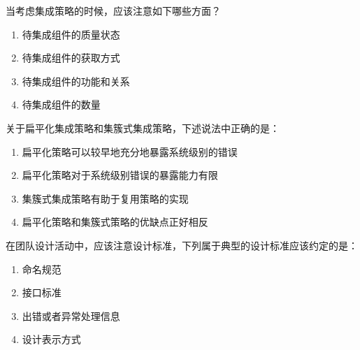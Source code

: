 \begin{problem}
	当考虑集成策略的时候，应该注意如下哪些方面？
    \vspace{-0.8em}
    \begin{multicols}{2}
        \begin{enumerate}[label=\Alph*.]
            \item 待集成组件的质量状态
            \item 待集成组件的获取方式
            \item 待集成组件的功能和关系
            \item 待集成组件的数量
        \end{enumerate}
    \end{multicols}
    \vspace{-1em}
\end{problem}



\begin{problem}
	关于扁平化集成策略和集簇式集成策略，下述说法中正确的是： 
        \begin{enumerate}[label=\Alph*.]
            \item 扁平化策略可以较早地充分地暴露系统级别的错误
            \item 扁平化策略对于系统级别错误的暴露能力有限
            \item 集簇式集成策略有助于复用策略的实现
            \item 扁平化策略和集簇式策略的优缺点正好相反
        \end{enumerate}
\end{problem}



\begin{problem}
	在团队设计活动中，应该注意设计标准，下列属于典型的设计标准应该约定的是：
    \vspace{-0.8em}
    \begin{multicols}{2}
        \begin{enumerate}[label=\Alph*.]
            \item 命名规范
            \item 接口标准
            \item 出错或者异常处理信息
            \item 设计表示方式
        \end{enumerate}
    \end{multicols}
    \vspace{-1em}
\end{problem}



